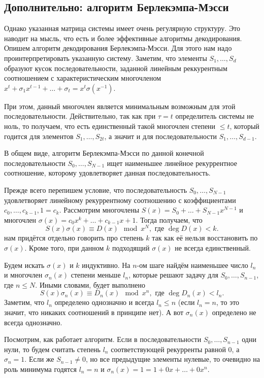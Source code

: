 \subsection{Дополнительно: алгоритм Берлекэмпа-Мэсси}
Однако указанная матрица системы имеет очень регулярную структуру. Это наводит на мысль, что есть и более эффективные алгоритмы декодирования. Опишем алгоритм декодирования Берлекэмпа-Мэсси. Для этого нам надо проинтерпретировать указанную систему. Заметим, что элементы $S_1,\dots,S_d$ образуют кусок последовательности, заданной линейным реккурентным соотношением с характеристическим многочленом $x^t+\sigma_1x^{t-1}+\dots + \sigma_t= x^t \sigma(x^{-1})$.

При этом, данный многочлен является минимальным возможным для этой последовательности. Действительно, так как при $\tau =t$ определитель системы не ноль, то получаем, что есть единственный такой многочлен степени $\leq t$, который годится для элементов $S_1,\dots,S_{2t}$, а значит и для последовательности $S_1,\dots,S_{d-1}$. 

В общем виде, алгоритм Берлекэмпа-Мэсси по данной конечной последовательности $S_0,\dots, S_{N-1}$ ищет наименьшее линейное рекуррентное соотношение, которому удовлетворяет данная последовательность. 

Прежде всего перепишем условие, что последовательность $S_0,\dots, S_{N-1}$ удовлетворяет линейному рекуррентному соотношению  с коэффициентами $c_0,\dots, c_{k-1}, 1=c_k$. Рассмотрим многочлены $S(x)=S_0+\dots+S_{N-1}x^{N-1}$ и многочлен $\sigma(x)=c_0x^k+\dots + c_{k-1}x+1$. Тогда получаем, что 
$$S(x)\sigma(x)\equiv D(x) \mod x^N, \text{ где } \deg D(x) < k.$$
нам придётся отдельно говорить про степень $k$ так как её нельзя восстановить по $\sigma(x)$. Кроме того, при данном $k$ подходящий  $\sigma(x)$ не всегда единственный.


Будем искать $\sigma(x)$ и $k$ индуктивно. На $n$-ом шаге найдём наименьшее число $l_n$ и многочлен $\sigma_n(x)$ степени меньше $l_n$, которые решают задачу для $S_0,\dots, S_{n-1}$, где $n\leq N$. Иными словами, будет выполнено 
$$ S(x)\sigma_n(x) \equiv D_n(x) \mod x^n, \text{ где } \deg D_n(x) < l_n.$$
Заметим, что $l_n$ определено однозначно и всегда $l_n\leq n$ (если $l_n=n$, то это значит, что никаких соотношений в принципе нет). А  вот $\sigma_n(x)$ определено не всегда однозначно.



Посмотрим, как работает алгоритм. Если в последовательности $S_0,\dots,S_{n-1}$ одни нули, то будем считать степень $l_n$ соответствующей рекурренты равной $0$, а $\sigma_n=1$. Если же $S_{n-1}\neq 0$, но все предыдущие элементы нулевые, то очевидно на роль минимума годятся $l_n=n$ и $\sigma_n(x)=1= 1+0x+\dots+0x^n$.


